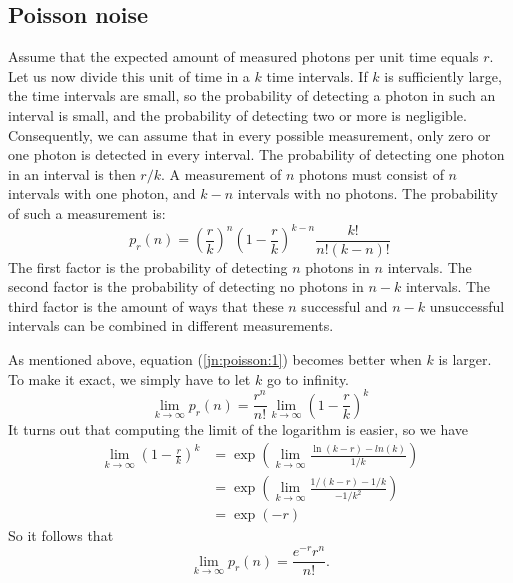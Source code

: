 \documentclass[11pt,oneside]{article}
\begin{document}
\subsection{Poisson noise} \label{app:poisson}
Assume that the expected amount of measured photons per unit time equals $r$.
Let us now divide this unit of time in a $k$ time intervals. If $k$ is
sufficiently large, the time intervals are small, so the probability of
detecting a photon in such an interval is small, and the probability of
detecting two or more is negligible. Consequently, we can assume that in every
possible measurement, only zero or one photon is detected in every
interval. The probability of detecting one photon in an interval is then $r /
k$. A measurement of $n$ photons must consist of $n$ intervals with one
photon, and $k - n$ intervals with no photons. The probability of such a
measurement is:
\begin{equation}
p_r(n) = \left( \frac{r}{k} \right)^n \left(1 - \frac{r}{k} \right)^{k-n}
       \frac{k!}{n!(k-n)!} 
\label{jn:poisson:1}
\end{equation}
The first factor is the probability of detecting $n$ photons in $n$ intervals.
The second factor is the probability of detecting no photons in $n - k$
intervals.  The third factor is the amount of ways that these $n$ successful
and $n-k$ unsuccessful intervals can be combined in different measurements.

As mentioned above, equation (\ref{jn:poisson:1}) becomes better when $k$ is
larger.  To make it exact, we simply have to let $k$ go to infinity.
\begin{equation}
  \lim_{k \rightarrow \infty} p_r(n) 
  = \frac{r^n}{n!} \lim_{k \rightarrow \infty} \left( 1 - \frac{r}{k} \right)^k
\end{equation}
It turns out that computing the limit of the logarithm is easier, so we have
\begin{align}
  \lim_{k \rightarrow \infty} \left( 1 - \frac{r}{k} \right)^k
 &=
 \exp \left(\lim_{k \rightarrow \infty} \frac{\ln(k - r) - ln(k)}{1/k}  \right)
\nonumber\\
&= 
  \exp \left(\lim_{k \rightarrow \infty}  
  \frac{1/ (k-r) - 1/k}{-1/k^2} \right) \nonumber \\
&= \exp (-r)
\end{align}
So it follows that 
\begin{equation}
  \lim_{k \rightarrow \infty} p_r(n) = \frac{e^{-r} r^n}{n!}. 
\end{equation}
\end{document}

